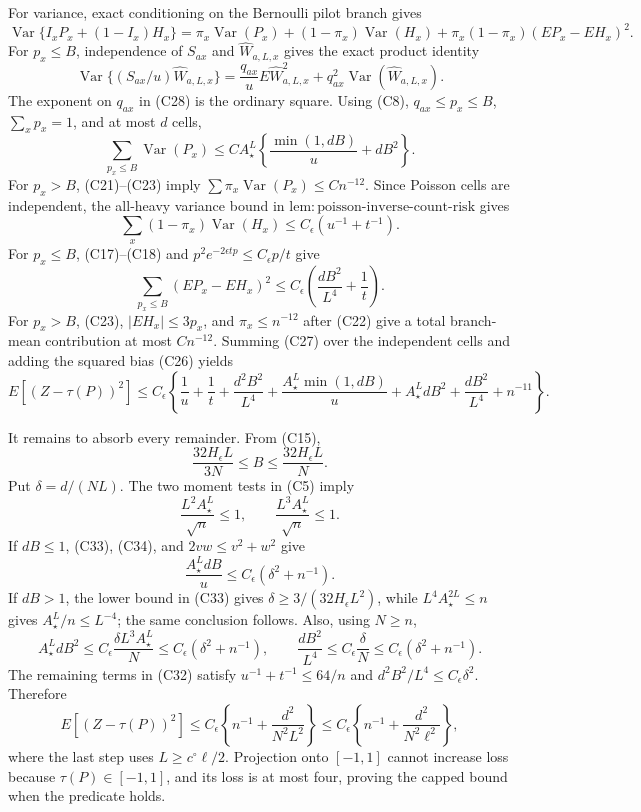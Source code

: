 For variance, exact conditioning on the Bernoulli pilot branch gives
\[
 \operatorname{Var}\{I_xP_x+(1-I_x)H_x\}
 =\pi_x\operatorname{Var}(P_x)+(1-\pi_x)\operatorname{Var}(H_x)
 +\pi_x(1-\pi_x)(EP_x-EH_x)^2.                                    \tag{C27}
\]
For \(p_x\le B\), independence of \(S_{ax}\) and \(\widehat W_{a,L,x}\) gives the exact product identity
\[
 \operatorname{Var}\{(S_{ax}/u)\widehat W_{a,L,x}\}
 =\frac{q_{ax}}uE\widehat W_{a,L,x}^{2}
 +q_{ax}^{2}\operatorname{Var}(\widehat W_{a,L,x}).                \tag{C28}
\]
The exponent on \(q_{ax}\) in (C28) is the ordinary square.  Using (C8), \(q_{ax}\le p_x\le B\), \(\sum_xp_x=1\), and at most \(d\) cells,
\[
 \sum_{p_x\le B}\operatorname{Var}(P_x)
 \le C A_\star^L\left\{\frac{\min(1,dB)}u+dB^2\right\}.          \tag{C29}
\]
For \(p_x>B\), (C21)--(C23) imply \(\sum\pi_x\operatorname{Var}(P_x)\le Cn^{-12}\).  Since Poisson cells are independent, the all-heavy variance bound in \(\mathrm{lem:poisson\mbox{-}inverse\mbox{-}count\mbox{-}risk}\) gives
\[
 \sum_x(1-\pi_x)\operatorname{Var}(H_x)
 \le C_\epsilon(u^{-1}+t^{-1}).                                   \tag{C30}
\]
For \(p_x\le B\), (C17)--(C18) and \(p^2e^{-2\epsilon tp}\le C_\epsilon p/t\) give
\[
 \sum_{p_x\le B}(EP_x-EH_x)^2
 \le C_\epsilon\left(\frac{dB^2}{L^4}+\frac1t\right).             \tag{C31}
\]
For \(p_x>B\), (C23), \(|EH_x|\le3p_x\), and \(\pi_x\le n^{-12}\) after (C22) give a total branch-mean contribution at most \(Cn^{-12}\).  Summing (C27) over the independent cells and adding the squared bias (C26) yields
\[
 E[(Z-\tau(P))^2]\le C_\epsilon\left\{
 \frac1u+\frac1t+\frac{d^2B^2}{L^4}
 +\frac{A_\star^L\min(1,dB)}u+A_\star^LdB^2
 +\frac{dB^2}{L^4}+n^{-11}\right\}.                               \tag{C32}
\]

It remains to absorb every remainder.  From (C15),
\[
 \frac{32H_\epsilon L}{3N}\le B\le\frac{32H_\epsilon L}{N}.       \tag{C33}
\]
Put \(\delta=d/(NL)\).  The two moment tests in (C5) imply
\[
 \frac{L^2A_\star^L}{\sqrt n}\le1,\qquad
 \frac{L^3A_\star^L}{\sqrt n}\le1.                               \tag{C34}
\]
If \(dB\le1\), (C33), (C34), and \(2vw\le v^2+w^2\) give
\[
 \frac{A_\star^LdB}{u}\le C_\epsilon(\delta^2+n^{-1}).
\]
If \(dB>1\), the lower bound in (C33) gives \(\delta\ge3/(32H_\epsilon L^2)\), while \(L^4A_\star^{2L}\le n\) gives \(A_\star^L/n\le L^{-4}\); the same conclusion follows.  Also, using \(N\ge n\),
\[
 A_\star^LdB^2\le C_\epsilon\frac{\delta L^3A_\star^L}{N}
 \le C_\epsilon(\delta^2+n^{-1}),
 \qquad
 \frac{dB^2}{L^4}\le C_\epsilon\frac\delta N
 \le C_\epsilon(\delta^2+n^{-1}).                                 \tag{C35}
\]
The remaining terms in (C32) satisfy \(u^{-1}+t^{-1}\le64/n\) and \(d^2B^2/L^4\le C_\epsilon\delta^2\).  Therefore
\[
 E[(Z-\tau(P))^2]\le C_\epsilon\left\{n^{-1}+\frac{d^2}{N^2L^2}\right\}
 \le C_\epsilon\left\{n^{-1}+\frac{d^2}{N^2\ell^2}\right\},      \tag{C36}
\]
where the last step uses \(L\ge c^\circ\ell/2\).  Projection onto \([-1,1]\) cannot increase loss because \(\tau(P)\in[-1,1]\), and its loss is at most four, proving the capped bound when the predicate holds.

